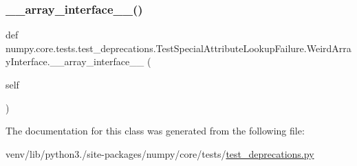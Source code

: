 \subsubsection{\texorpdfstring{\+\_\+\+\_\+array\+\_\+interface\+\_\+\+\_\+()}{\_\_array\_interface\_\_()}}
{\footnotesize\ttfamily def numpy.\+core.\+tests.\+test\+\_\+deprecations.\+Test\+Special\+Attribute\+Lookup\+Failure.\+Weird\+Array\+Interface.\+\_\+\+\_\+array\+\_\+interface\+\_\+\+\_\+ (\begin{DoxyParamCaption}\item[{}]{self }\end{DoxyParamCaption})}



The documentation for this class was generated from the following file\+:\begin{DoxyCompactItemize}
\item 
venv/lib/python3./site-\/packages/numpy/core/tests/\hyperlink{core_2tests_2test__deprecations_8py}{test\+\_\+deprecations.\+py}\end{DoxyCompactItemize}
